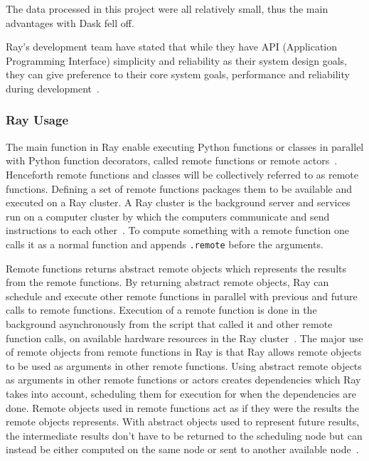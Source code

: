 \documentclass[12pt, a4paper]{article}
\begin{document}
The data processed in this project were all relatively small, thus the main advantages with Dask fell off.

Ray's development team have stated that while they have API (Application Programming Interface) simplicity and reliability as their system design goals, they can give preference to their core system goals, performance and reliability during development~\cite{ray:SystemDesign}.


\subsubsection{Ray Usage}

The main function in Ray enable executing Python functions or classes in parallel with Python function decorators, called remote functions or remote actors~\cite{ray:remoteFunctions, ray:remoteClasses}.
Henceforth remote functions and classes will be collectively referred to as remote functions.
Defining a set of remote functions packages them to be available and executed on a Ray cluster.
A Ray cluster is the background server and services run on a computer cluster by which the computers communicate and send instructions to each other~\cite{ray:rayCluster}.%
To compute something with a remote function one calls it as a normal function and appends \texttt{.remote} before the arguments. 

Remote functions returns abstract remote objects which represents the results from the remote functions.
By returning abstract remote objects, Ray can schedule and execute other remote functions in parallel with previous and future calls to remote functions.
Execution of a remote function is done in the background asynchronously from the script that called it and other remote function calls, on available hardware resources in the Ray cluster~\cite{ray:remoteFunctions}.
The major use of remote objects from remote functions in Ray is that Ray allows remote objects to be used as arguments in other remote functions.
Using abstract remote objects as arguments in other remote functions or actors creates dependencies which Ray takes into account, scheduling them for execution for when the dependencies are done.
Remote objects used in remote functions act as if they were the results the remote objects represents.
With abstract objects used to represent future results, the intermediate results don't have to be returned to the scheduling node but can instead be either computed on the same node or sent to another available node~\cite{ray:remoteObjects}.
\end{document}
